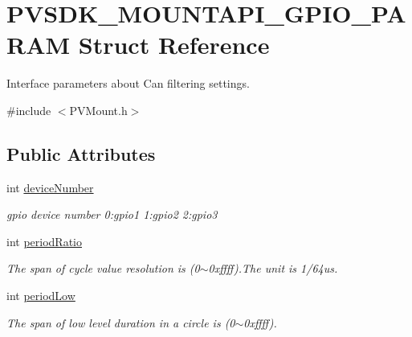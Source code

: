\hypertarget{struct_p_v_s_d_k___m_o_u_n_t_a_p_i___g_p_i_o___p_a_r_a_m}{}\section{P\+V\+S\+D\+K\+\_\+\+M\+O\+U\+N\+T\+A\+P\+I\+\_\+\+G\+P\+I\+O\+\_\+\+P\+A\+R\+AM Struct Reference}
\label{struct_p_v_s_d_k___m_o_u_n_t_a_p_i___g_p_i_o___p_a_r_a_m}


Interface parameters about Can filtering settings.  




{\ttfamily \#include $<$P\+V\+Mount.\+h$>$}

\subsection*{Public Attributes}
\begin{DoxyCompactItemize}
\item 
\mbox{\label{struct_p_v_s_d_k___m_o_u_n_t_a_p_i___g_p_i_o___p_a_r_a_m_aa5e219b2d2e3f339d0654cf7587dda13}} 
int \hyperlink{struct_p_v_s_d_k___m_o_u_n_t_a_p_i___g_p_i_o___p_a_r_a_m_aa5e219b2d2e3f339d0654cf7587dda13}{device\+Number}
\begin{DoxyCompactList}\small\item\em gpio device number 0\+:gpio1 1\+:gpio2 2\+:gpio3 \end{DoxyCompactList}\item 
\mbox{\label{struct_p_v_s_d_k___m_o_u_n_t_a_p_i___g_p_i_o___p_a_r_a_m_a43ceaa02b9d648d9acec7eb3d448a7f9}} 
int \hyperlink{struct_p_v_s_d_k___m_o_u_n_t_a_p_i___g_p_i_o___p_a_r_a_m_a43ceaa02b9d648d9acec7eb3d448a7f9}{period\+Ratio}
\begin{DoxyCompactList}\small\item\em The span of cycle value resolution is (0$\sim$0xffff).The unit is 1/64us. \end{DoxyCompactList}\item 
\mbox{\label{struct_p_v_s_d_k___m_o_u_n_t_a_p_i___g_p_i_o___p_a_r_a_m_a192af6ca59f2102d675ec9754e31de45}} 
int \hyperlink{struct_p_v_s_d_k___m_o_u_n_t_a_p_i___g_p_i_o___p_a_r_a_m_a192af6ca59f2102d675ec9754e31de45}{period\+Low}
\begin{DoxyCompactList}\small\item\em The span of low level duration in a circle is (0$\sim$0xffff). \end{DoxyCompactList}\end{DoxyCompactItemize}


